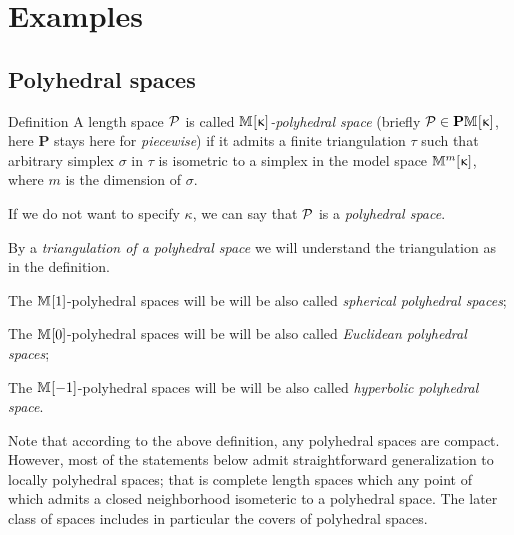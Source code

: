 \chapter{Examples}

\section{Polyhedral spaces}

\begin{thm}{Definition}\label{def:poly}
A length space $\mathcal{P}$ is called
\emph{$\mathbb{M}_{{}}^{}[{\upkappa}]$-polyhedral space} (briefly $\spc{P}\in \PM{}\kappa$, here $\mathbf{P}$ stays here for \emph{piecewise})
if it admits a finite triangulation $\tau$ 
such that arbitrary simplex $\sigma$ in $\tau$ is isometric to a simplex in the model space $\mathbb{M}_{{}}^{m}[{\upkappa}]$, 
where $m$ is the dimension of $\sigma$.

If we do not want to specify $\kappa$, we can say that $\mathcal{P}$ is a \emph{polyhedral space}.

By a 
\emph{triangulation of a polyhedral space} 
we will understand the triangulation as in the definition. 

\begin{subthm}{}
The $\mathbb{M}_{{}}^{}[{1}]$-polyhedral spaces will be 
will be also called 
\emph{spherical polyhedral spaces};
\end{subthm}

\begin{subthm}{}
The $\mathbb{M}_{{}}^{}[{0}]$-polyhedral spaces will be 
will be also called 
\emph{Euclidean polyhedral spaces};
\end{subthm}

\begin{subthm}{}
The $\mathbb{M}_{{}}^{}[{-1}]$-polyhedral spaces will be 
will be also called 
\emph{hyperbolic polyhedral space}.
\end{subthm}
\end{thm}

Note that according to the above definition,
any polyhedral spaces are compact.
However, 
most of the statements below admit straightforward generalization to locally polyhedral spaces;
that is complete length spaces which any point of which admits a closed neighborhood isometeric to a polyhedral space.
The later class of spaces includes in particular the covers of polyhedral  spaces.

